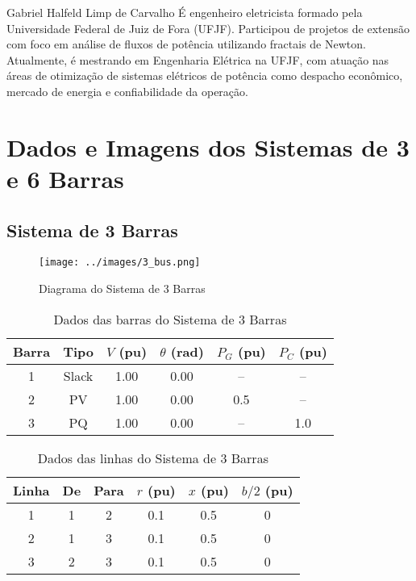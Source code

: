 \documentclass[journal]{IEEEtran}
\begin{document}
\begin{IEEEbiography}{Gabriel Halfeld Limp de Carvalho}
É engenheiro eletricista formado pela Universidade Federal de Juiz de Fora (UFJF). Participou de projetos de extensão com foco em análise de fluxos de potência utilizando fractais de Newton. Atualmente, é mestrando em Engenharia Elétrica na UFJF, com atuação nas áreas de otimização de sistemas elétricos de potência como despacho econômico, mercado de energia e confiabilidade da operação.


\end{IEEEbiography}


\vfill
\clearpage
\appendix
\section{Dados e Imagens dos Sistemas de 3 e 6 Barras}

\subsection{Sistema de 3 Barras}
\begin{figure}[h!]
  \centering
  \texttt{[image: ../images/3\_bus.png]}
  \caption{Diagrama do Sistema de 3 Barras}
\end{figure}

\begin{table}[h!]
\centering
\caption{Dados das barras do Sistema de 3 Barras}
\label{tab:3bus_barras}
\begin{tabular}{c|c|c|c|c|c}
\hline
Barra & Tipo  & $V$ (pu) & $\theta$ (rad) & $P_{G}$ (pu) & $P_{C}$ (pu) \\
\hline
1 & Slack & 1.00 & 0.00 & --   & --   \\
2 & PV    & 1.00 & 0.00 & 0.5  & --   \\
3 & PQ    & 1.00 & 0.00 & --   & 1.0  \\
\hline
\end{tabular}
\end{table}

\vspace{1em}

\begin{table}[h!]
\centering
\caption{Dados das linhas do Sistema de 3 Barras}
\label{tab:3bus_linhas}
\begin{tabular}{c|c|c|c|c|c}
\hline
Linha & De & Para & $r$ (pu) & $x$ (pu) & $b/2$ (pu) \\
\hline
1 & 1 & 2 & 0.1 & 0.5 & 0 \\
2 & 1 & 3 & 0.1 & 0.5 & 0 \\
3 & 2 & 3 & 0.1 & 0.5 & 0 \\
\hline
\end{tabular}
\end{table}
\end{document}
